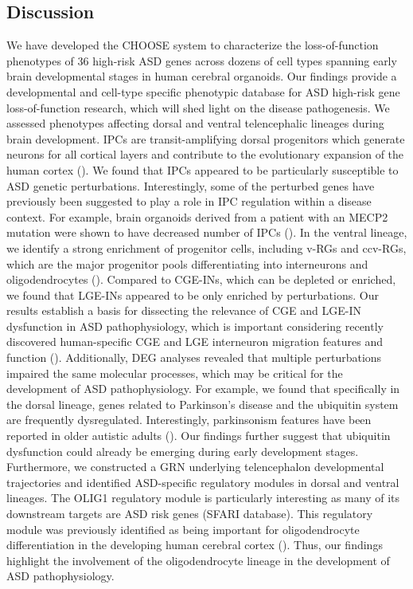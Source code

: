 \subsection{Discussion}
We have developed the CHOOSE system to characterize the loss-of-function phenotypes of 36 high-risk ASD genes across dozens of cell types spanning early brain developmental stages in human cerebral organoids. Our findings provide a developmental and cell-type specific phenotypic database for ASD high-risk gene loss-of-function research, which will shed light on the disease pathogenesis.
We assessed phenotypes affecting dorsal and ventral telencephalic lineages during brain development. IPCs are transit-amplifying dorsal progenitors which generate neurons for all cortical layers and contribute to the evolutionary expansion of the human cortex (\cite{martinez-cerdeno_role_2006,pebworth_human_2021}). We found that IPCs appeared to be particularly susceptible to ASD genetic perturbations. Interestingly, some of the perturbed genes have previously been suggested to play a role in IPC regulation within a disease context. For example, brain organoids derived from a patient with an MECP2 mutation were shown to have decreased number of IPCs (\cite{mellios_mecp2-regulated_2018}). 
In the ventral lineage, we identify a strong enrichment of progenitor cells, including v-RGs and ccv-RGs, which are the major progenitor pools differentiating into interneurons and oligodendrocytes (\cite{petryniak_dlx1_2007,kessaris_competing_2006}). Compared to CGE-INs, which can be depleted or enriched, we found that LGE-INs appeared to be only enriched by perturbations. Our results establish a basis for dissecting the relevance of CGE and LGE-IN dysfunction in ASD pathophysiology, which is important considering recently discovered human-specific CGE and LGE interneuron migration features and function (\cite{eichmuller_amplification_2022,schmitz_development_2022,paredes_extensive_2016}).
Additionally, DEG analyses revealed that multiple perturbations impaired the same molecular processes, which may be critical for the development of ASD pathophysiology. For example, we found that specifically in the dorsal lineage, genes related to Parkinson's disease and the ubiquitin system are frequently dysregulated. Interestingly, parkinsonism features have been reported in older autistic adults (\cite{geurts_self-reported_2022}). Our findings further suggest that ubiquitin dysfunction could already be emerging during early development stages. Furthermore, we constructed a GRN underlying telencephalon developmental trajectories and identified ASD-specific regulatory modules in dorsal and ventral lineages. The OLIG1 regulatory module is particularly interesting as many of its downstream targets are ASD risk genes (SFARI database). This regulatory module was previously identified as being important for oligodendrocyte differentiation in the developing human cerebral cortex (\cite{trevino_chromatin_2021}). Thus, our findings highlight the involvement of the oligodendrocyte lineage in the development of ASD pathophysiology.
